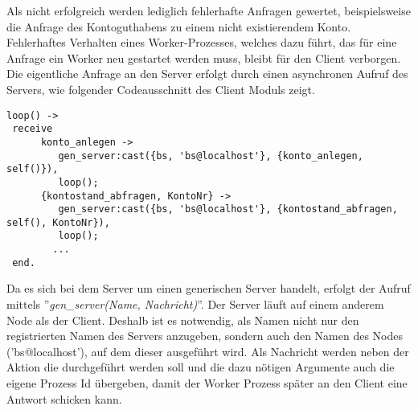 Als nicht erfolgreich werden lediglich fehlerhafte Anfragen gewertet, beispielsweise die Anfrage des Kontoguthabens zu einem nicht existierendem Konto. Fehlerhaftes Verhalten eines Worker-Prozesses, welches dazu führt, das für eine Anfrage ein Worker neu gestartet werden muss, bleibt für den Client verborgen.\\
Die eigentliche Anfrage an den Server erfolgt durch einen asynchronen Aufruf des Servers, wie folgender Codeausschnitt des Client Moduls zeigt.
\begin{lstlisting} 
loop() ->
 receive
      konto_anlegen ->
         gen_server:cast({bs, 'bs@localhost'}, {konto_anlegen, self()}),
         loop();
      {kontostand_abfragen, KontoNr} ->
         gen_server:cast({bs, 'bs@localhost'}, {kontostand_abfragen, self(), KontoNr}),
         loop();
		...
 end.
\end{lstlisting}
Da es sich bei dem Server um einen generischen Server handelt, erfolgt der Aufruf mittels ''\textit{gen\_server(Name, Nachricht)}''. Der Server läuft auf einem anderem Node als der Client. Deshalb ist es notwendig, als Namen nicht nur den registrierten Namen des Servers anzugeben, sondern auch den Namen des Nodes ('bs@localhost'), auf dem dieser ausgeführt wird. Als Nachricht werden neben der Aktion die durchgeführt werden soll und die dazu nötigen Argumente auch die eigene Prozess Id übergeben, damit der Worker Prozess später an den Client eine Antwort schicken kann.






















